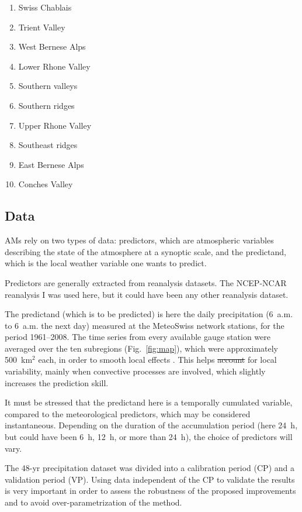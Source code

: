 \documentclass[review]{elsarticle}
\providecommand{\DIFaddtex}[1]{{\protect\color{blue}\uwave{#1}}} %
\providecommand{\DIFdeltex}[1]{{\protect\color{red}\sout{#1}}}                      %
\providecommand{\DIFaddbegin}{} %
\providecommand{\DIFaddend}{} %
\providecommand{\DIFdelbegin}{} %
\providecommand{\DIFdelend}{} %
\providecommand{\DIFadd}[1]{\texorpdfstring{\DIFaddtex{#1}}{#1}} %
\providecommand{\DIFdel}[1]{\texorpdfstring{\DIFdeltex{#1}}{}} %
\begin{document}
\begin{enumerate}
	\item Swiss Chablais
	\item Trient Valley
	\item West Bernese Alps
	\item Lower Rhone Valley
	\item Southern valleys
	\item Southern ridges
	\item Upper Rhone Valley
	\item Southeast ridges
	\item East Bernese Alps
	\item Conches Valley
\end{enumerate}


\subsection{Data}
\label{sec:data}

AMs rely on two types of data: predictors, which are atmospheric variables describing the state of the atmosphere at a synoptic scale, and the predictand, which is the local weather variable one wants to predict.

Predictors are generally extracted from reanalysis datasets. The NCEP-NCAR reanalysis I \citep[6-hourly, 17 pressure levels at a resolution of 2.5\degree, see][]{Kalnay1996} was used here, but it could have been any other reanalysis dataset.

The predictand (which is to be predicted) is here the daily precipitation (6~a.m. to 6~a.m. the next day) measured at the MeteoSwiss network stations, for the period 1961--2008. The time series from every available gauge station were averaged over the ten subregions (Fig.\ \ref{fig:map}), which were approximately 500~km$^{2}$ each, in order to smooth local effects \citep{Obled2002, Marty2012}. This helps \DIFdelbegin \DIFdel{account }\DIFdelend \DIFaddbegin \DIFadd{accounting }\DIFaddend for local variability, mainly when convective processes are involved, which slightly increases the prediction skill.

It must be stressed that the predictand here is a temporally cumulated variable, compared to the meteorological predictors, which may be considered instantaneous. Depending on the duration of the accumulation period (here 24~h, but could have been 6~h, 12~h, or more than 24~h), the choice of predictors will vary. 

The 48-yr precipitation dataset was divided into a calibration period (CP) and a validation period (VP). Using data independent of the CP to validate the results is very important in order to assess the robustness of the proposed improvements and to avoid over-parametrization of the method.
\end{document}

